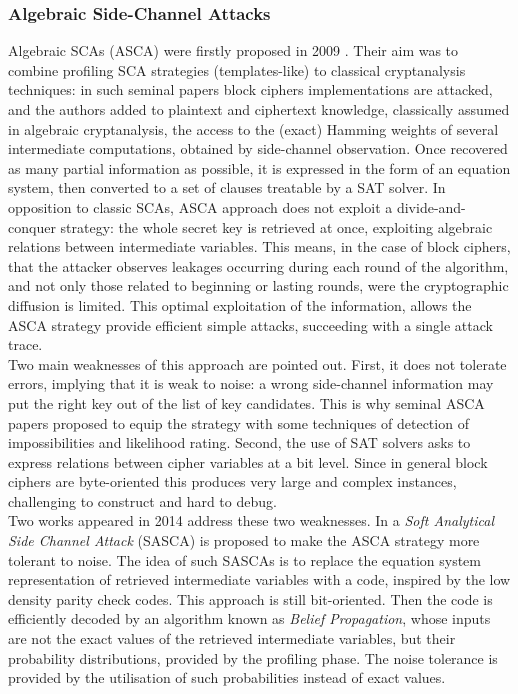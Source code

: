 \subsubsection{Algebraic Side-Channel Attacks}
Algebraic SCAs (ASCA) were firstly proposed in 2009 \cite{ASCA,renauld2009algebraic}. Their aim was to combine profiling SCA strategies (templates-like) to classical cryptanalysis techniques: in such seminal papers block ciphers implementations are attacked, and the authors added to plaintext and ciphertext knowledge, classically assumed in algebraic cryptanalysis, the access to the (exact) Hamming weights of  several intermediate computations, obtained by side-channel observation. Once recovered as many partial information as possible, it is expressed in the form of an equation system, then converted to a set of clauses treatable by a SAT solver. In opposition to classic SCAs, ASCA approach does not exploit a divide-and-conquer strategy: the whole secret key is retrieved at once, exploiting algebraic relations between intermediate variables. This means, in the case of block ciphers, that the attacker observes leakages occurring during each round of the algorithm, and not only those related to beginning or lasting rounds, were the cryptographic diffusion is limited. This optimal exploitation of the information, allows the ASCA strategy provide efficient simple attacks, \ie succeeding with a single attack trace.\\
Two main weaknesses of this approach are pointed out. First, it does not tolerate errors, implying that it is weak to noise: a wrong side-channel information may put the right key out of the list of key candidates. This is why seminal ASCA papers proposed to equip the strategy with some techniques of detection of impossibilities and likelihood rating. Second, the use of SAT solvers asks to express relations between cipher variables at a bit level. Since in general block ciphers are byte-oriented this produces very large and complex instances, challenging to construct and hard to debug.\\
Two works appeared in 2014 address these two weaknesses. In \cite{soft} a \emph{Soft Analytical Side Channel Attack} (SASCA) is proposed to make the ASCA strategy more tolerant to noise. The idea of such SASCAs is to replace the equation system representation of retrieved intermediate variables with a code, inspired by the low density parity check codes. This approach is still bit-oriented. Then the code is efficiently decoded by an algorithm known as \emph{Belief Propagation}, whose inputs are not the exact values of the retrieved intermediate variables, but their probability distributions, provided by the profiling phase. The noise tolerance is provided by the utilisation of such probabilities instead of exact values. \\
